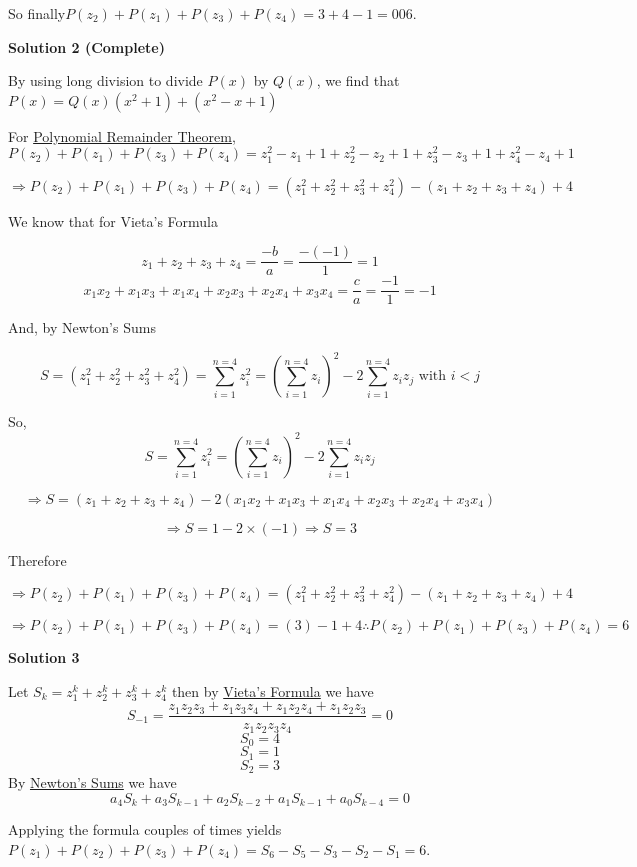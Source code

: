 \begin{enumerate}
 So finally$P(z_2)+P(z_1)+P(z_3)+P(z_4)=3+4-1=\boxed{006}.$




\textbf{Solution 2 (Complete)}

By using long division to divide $P(x)$ by $Q(x)$, we find that $P(x) = Q(x)(x^2 + 1) + (x^2 - x + 1)$

 For \href{https://artofproblemsolving.com/wiki/index.php?title=Polynomial\_Remainder\_Theorem}{Polynomial Remainder Theorem},  
 \[P(z_2)+P(z_1)+P(z_3)+P(z_4)=z_1^2-z_1+1+z_2^2-z_2+1+z_3^2-z_3+1+z_4^2-z_4+1\]

 \[\Rightarrow P(z_2)+P(z_1)+P(z_3)+P(z_4)=(z_1^2+z_2^2+z_3^2+z_4^2)-(z_1+z_2+z_3+z_4)+4\] 

 We know that for Vieta's Formula

 
 \[z_1+z_2+z_3+z_4=\frac{-b}{a}=\frac{-(-1)}{1}=1\]
 \[x_1x_2 + x_1x_3 + x_1x_4 + x_2x_3 + x_2x_4 + x_3x_4= \frac{c}{a} = \frac{-1}{1} = -1\]

 And, by Newton's Sums

 
 \[S=(z_1^2+z_2^2+z_3^2+z_4^2)= \sum_{i=1}^{n=4} z_i^2 = \left( \sum_{i=1}^{n=4} z_i \right)^2 - 2 \sum_{i=1}^{n=4}z_i z_j \text{ with } i<j\]

 So, 
 \[S= \sum_{i=1}^{n=4} z_i^2 = \left( \sum_{i=1}^{n=4} z_i \right)^2 - 2 \sum_{i=1}^{n=4}z_i z_j\]

 \[\Rightarrow S = (z_1+z_2+z_3+z_4)-2(x_1x_2 + x_1x_3 + x_1x_4 + x_2x_3 + x_2x_4 + x_3x_4)\]

 \[\Rightarrow S= 1 -2\times (-1) \Rightarrow S = 3\]

 Therefore

 
 \[\Rightarrow P(z_2)+P(z_1)+P(z_3)+P(z_4)=(z_1^2+z_2^2+z_3^2+z_4^2)-(z_1+z_2+z_3+z_4)+4\]

 \[\Rightarrow P(z_2)+P(z_1)+P(z_3)+P(z_4) = (3)- 1 + 4 \therefore \boxed{ P(z_2)+P(z_1)+P(z_3)+P(z_4)=6}\]




\textbf{Solution 3}

Let $S_k=z_1^k+z_2^k+z_3^k+z_4^k$ then by \href{https://artofproblemsolving.com/wiki/index.php?title=Vieta\%27s\_Formula}{Vieta's Formula} we have
 \[S_{-1}=\frac{z_1z_2z_3+z_1z_3z_4+z_1z_2z_4+z_1z_2z_3}{z_1z_2z_3z_4}=0\]
 \[S_0=4\]
 \[S_1=1\]
 \[S_2=3\]By \href{https://artofproblemsolving.com/wiki/index.php?title=Newton\%27s\_Sums}{Newton's Sums} we have 
 \[a_4S_k+a_3S_{k-1}+a_2S_{k-2}+a_1S_{k-1}+a_0S_{k-4}=0\]

 Applying the formula couples of times yields $P(z_1)+P(z_2)+P(z_3)+P(z_4)=S_6-S_5-S_3-S_2-S_1=\boxed{6}$.


\end{enumerate}
